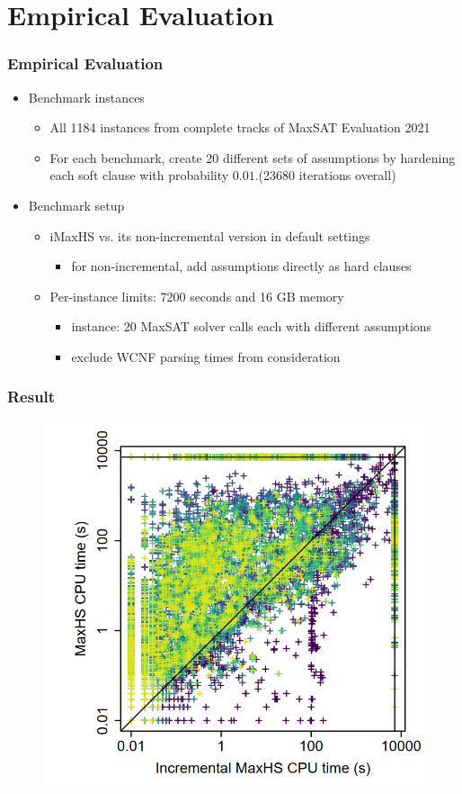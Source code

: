 \documentclass[aspectratio=169 %
,serif,mathserif]{beamer}
\begin{document}
\section{Empirical Evaluation}
\begin{frame}
	\frametitle{Empirical Evaluation}
	\begin{itemize}
		\item Benchmark instances
		\begin{itemize}
			\item All 1184 instances from complete tracks of MaxSAT Evaluation 2021
			\item For each benchmark, create 20 different sets of assumptions by hardening each soft clause with probability $0.01$.(23680 iterations overall)
		\end{itemize} \pause
		\item Benchmark setup
		\begin{itemize}
			\item iMaxHS vs. its non-incremental version in default settings
			\begin{itemize}
				\item for non-incremental, add assumptions directly as hard clauses
			\end{itemize}
			\item Per-instance limits: 7200 seconds and 16 GB memory
			\begin{itemize}
				\item instance: 20 MaxSAT solver calls each with different assumptions
				\item exclude WCNF parsing times from consideration
			\end{itemize}
		\end{itemize} 
	\end{itemize}
\end{frame}

\begin{frame}
	\frametitle{Result}
	\begin{figure}[htbp]
		\includegraphics[width=.42\linewidth]{10.png}
	\end{figure}
\end{frame}
\end{document}
